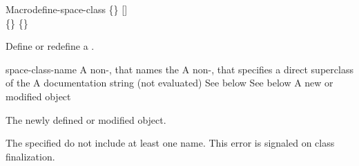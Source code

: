 \documentclass[10pt,twoside,english,pdftex]{article}
\begin{document}

\begin{functiondoc}{Macro}{define-space-class}%
   { 
   \code{(}\{\}\superstar\code{)}
   [] \\
   \code{(}\{\}\superstar\code{)}
   \{\}\superstar{}
   \returns{} }
%
%
%

\fnsyntax

\fnpurpose Define or redefine a .

\fnpackage {}

\fnmodule {}

\fnargs
\begin{args}{space-class-name}
 A non-\nil,  that names the
 A non-\nil,  that specifies a
direct superclass of the    
\arg[documentation] A documentation string (not evaluated)
 See below
 See below
 A new or modified  object
\end{args}

\fnreturns The newly defined or modified  object.

\fnerrors The specified  do not include at least
one  name.  This error is signaled on class finalization.


\end{functiondoc}
\end{document}
